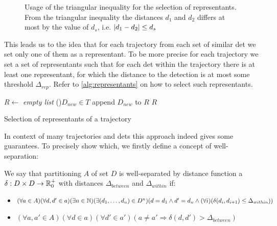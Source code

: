 \begin{figure}
    \centering
    \def\svgwidth{\columnwidth}
    \scalebox{0.6}{}
    \caption[Usage of triangular inequality for the selection of representants]{Usage of the triangular inequality for the selection of representants. From the triangular inequality the distances $d_1$ and $d_2$ differs at most by the value of $d_s$, i.e. $\left|{d_1 - d_2}\right| \leq d_s$}
    \label{fig:triangular}
\end{figure}

This leads us to the idea that for each trajectory from each set of similar \gls{det} we set only one of them as a representant. To be more precise for each trajectory we set a set of representants such that for each \gls{det} within the trajectory there is at least one representant, for which the distance to the detection is at most some threshold $\Delta_{rep}$. Refer to \autoref{alg:representants} on how to select such representants.

\begin{algorithm}

 
 \BlankLine
 $R \leftarrow$ \emph{empty list}\;
 \For(){$D_{new} \in T$}{
  append $D_{new}$ to $R$\;
 }
 \Return $R$
 \caption{Selection of representants of a trajectory}
 \label{alg:representants}
\end{algorithm}

In context of many trajectories and \glspl{det} this approach indeed gives some guarantees. To precisely show which, we firstly define a concept of well-separation:

\begin{defn}
We say that partitioning $A$ of set $D$ is well-separated by distance function a $\delta: D \times D \rightarrow \mathbb{R}_0^+$ with distances $\Delta_{between}$ and $\Delta_{within}$ if:
\begin{itemize}
    \item $(\forall a \in A)(\forall d, d' \in a) (\exists n \in \mathbb{N}) (\exists (d_1, \ldots, d_n) \in D^n) (d = d_1 \land d' = d_n \land (\forall i) (\delta(d_i, d_{i+1}) \leq \Delta_{within}))$
    \item $(\forall a, a' \in A) (\forall d \in a) (\forall d' \in a') (a \neq a' \Rightarrow \delta(d, d') > \Delta_{between})$
\end{itemize}
\end{defn}

